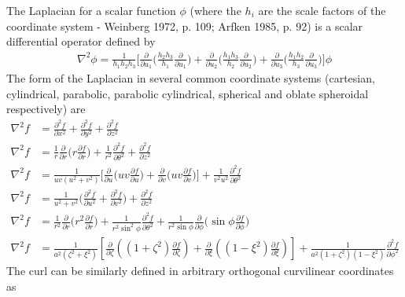The Laplacian for a scalar function $\phi$ (where the $h_i$ are the scale factors of the coordinate system - Weinberg 1972, p. 109; Arfken 1985, p. 92) is a scalar differential operator defined by
\begin{align}
	\nabla^2 \phi = \frac{1}{h_1h_2h_3} \bigg[	\frac{\partial}{\partial u_1} \bigg( \frac{h_2h_3}{h_1} \frac{\partial}{\partial u_1} \bigg) + \frac{\partial}{\partial u_2} \bigg( \frac{h_1h_3}{h_2} \frac{\partial}{\partial u_2} \bigg) + \frac{\partial}{\partial u_3} \bigg( \frac{h_1h_2}{h_3} \frac{\partial}{\partial u_3} \bigg) \bigg] \phi
\end{align}
The form of the Laplacian in several common coordinate systems (cartesian, cylindrical, parabolic, parabolic cylindrical, spherical and oblate spheroidal respectively) are
\begin{align}
	\nabla^2 f &= \frac{\partial^2 f}{\partial x^2}+ \frac{\partial^2 f}{\partial y^2}+ \frac{\partial^2 f}{\partial z^2} \\
	\nabla^2 f &=\frac{1}{r}\frac{\partial}{\partial r}\bigg(r \frac{\partial f}{\partial r}\bigg)+\frac{1}{r^2}\frac{\partial^2 f}{\partial \theta^2}+\frac{\partial^2 f}{\partial z^2} \\
	\nabla^2 f &= \frac{1}{uv(u^2+v^2)}\bigg[\frac{\partial}{\partial u}\bigg( uv\frac{\partial f}{\partial u} \bigg) + \frac{\partial}{\partial v}\bigg(u v \frac{\partial f}{\partial v}\bigg)\bigg]+\frac{1}{v^2u^2}\frac{\partial^2 f}{\partial \theta^2} \\
	\nabla^2 f &= \frac{1}{u^2+v^2}\bigg(\frac{\partial^2 f}{\partial u^2}+\frac{\partial^2 f}{\partial v^2} \bigg)+\frac{\partial^2 f}{\partial z^2} \\
	\nabla^2 f &= \frac{1}{r^2} \frac{\partial}{\partial r}\bigg(r^2 \frac{\partial f}{\partial r} \bigg)+\frac{1}{r^2 \sin^2 \phi}\frac{\partial^2 f}{\partial \theta^2} +\frac{1}{r^2\sin\phi}\frac{\partial}{\partial\phi}\bigg(\sin\phi \frac{\partial f}{\partial \phi} \bigg) \\
	\nabla^2 f&= \frac{1}{a^2(\zeta^2+\xi^2)}\left[\frac{\partial}{\partial \zeta}\left((1+\zeta^2)\frac{\partial f}{\partial \zeta}\right) +\frac{\partial}{\partial \xi}\left((1-\xi^2)\frac{\partial f}{\partial \xi}\right) \right] +\frac{1}{a^2(1+\zeta^2)(1-\xi^2)} \frac{\partial^2 f}{\partial \phi^2}
\end{align}
The curl can be similarly defined in arbitrary orthogonal curvilinear coordinates as
